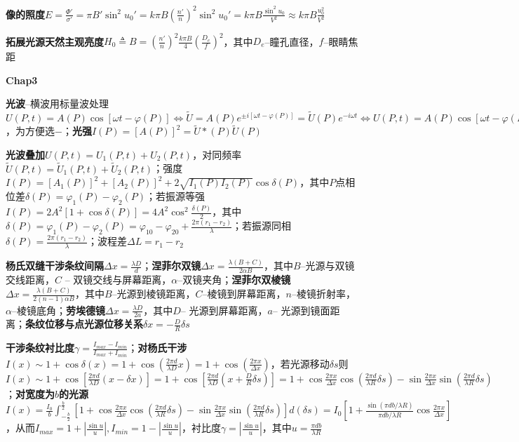 \documentclass[10pt,a4paper]{article}
\begin{document}
\textbf{像的照度}$E=\frac{\Phi'}{\sigma'}=\pi B'\sin^2u_0'=k\pi B(\frac{n'}{n})^2\sin^2u_0'=k\pi B\frac{\sin^2u_0}{V^2}\approx k\pi B\frac{u_0^2}{V^2}$

\textbf{拓展光源天然主观亮度}$H_0\triangleq B=(\frac{n'}{n})^2\frac{k\pi B}{4}(\frac{D_e}{f})^2$，其中$D_e$--瞳孔直径，$f$--眼睛焦距

\textbf{Chap3}

\textbf{光波}--横波用标量波处理$U(P,t)=A(P)\cos[\omega t-\varphi(P)]\Leftrightarrow\widetilde{U}=A(P)e^{\pm i[\omega t-\varphi(P)]}=\widetilde{U}(P)e^{-i\omega t}\Leftrightarrow U(P,t)=A(P)\cos[\omega t-\varphi(P)]$，为方便选$-$；\textbf{光强}$I(P)=[A(P)]^2=\widetilde{U}*(P)\widetilde{U}(P)$

\textbf{光波叠加}$U(P,t)=U_1(P,t)+U_2(P,t)$，对同频率$\widetilde{U}(P,t)=\widetilde{U}_1(P,t)+\widetilde{U}_2(P,t)$；强度$I(P)=[A_1(P)]^2+[A_2(P)]^2+2\sqrt{I_1(P)I_2(P)}\cos\delta(P)$，其中$P$点相位差$\delta(P)=\varphi_1(P)-\varphi_2(P)$；若振源等强$I(P)=2A^2[1+\cos\delta(P)]=4A^2\cos^2\frac{\delta(P)}{2}$，其中$\delta(P)=\varphi_1(P)-\varphi_2(P)=\varphi_{10}-\varphi_{20}+\frac{2\pi(r_1-r_2)}{\lambda}$；若振源同相$\delta(P)=\frac{2\pi(r_1-r_2)}{\lambda}$；波程差$\Delta L=r_1-r_2$

\textbf{杨氏双缝干涉条纹间隔}$\Delta x=\frac{\lambda D}{d}$；\textbf{涅菲尔双镜}$\Delta x=\frac{\lambda(B+C)}{2\alpha B}$，其中$B$--光源与双镜交线距离，$C$ -- 双镜交线与屏幕距离，$\alpha$--双镜夹角；\textbf{涅菲尔双棱镜}$\Delta x=\frac{\lambda(B+C)}{2(n-1)\alpha B}$，其中$B$--光源到棱镜距离，$C$--棱镜到屏幕距离，$n$--棱镜折射率，$\alpha$--棱镜底角；\textbf{劳埃德镜}$\Delta x=\frac{\lambda D}{2a}$，其中$D$-- 光源到屏幕距离，$a$-- 光源到镜面距离；\textbf{条纹位移与点光源位移关系}$\delta x=-\frac{D}{R}\delta s$

\textbf{干涉条纹衬比度}$\gamma=\frac{I_{max}-I_{min}}{I_{max}+I_{min}}$；\textbf{对杨氏干涉}$I(x)\sim1+\cos\delta(x)=1+\cos(\frac{2\pi d}{\lambda D}x)=1+\cos(\frac{2\pi x}{\Delta x})$，若光源移动$\delta s$则$I(x)\sim1+\cos[\frac{2\pi d}{\lambda D}(x-\delta x)]=1+\cos[\frac{2\pi d}{\lambda D}(x+\frac{D}{R}\delta s)]=1+\cos\frac{2\pi x}{\Delta x}\cos(\frac{2\pi d}{\lambda R}\delta s)-\sin\frac{2\pi x}{\Delta x}\sin(\frac{2\pi d}{\lambda R}\delta s)$；\textbf{对宽度为$b$的光源}$I(x)=\frac{I_0}{b}\int_{-\frac{b}{2}}^{\frac{b}{2}}[1+\cos\frac{2\pi x}{\Delta x}\cos(\frac{2\pi d}{\lambda R}\delta s)-\sin\frac{2\pi x}{\Delta x}\sin(\frac{2\pi d}{\lambda R}\delta s)]d(\delta s)=I_0[1+\frac{\sin(\pi db/\lambda R)}{\pi db/\lambda R}\cos\frac{2\pi x}{\Delta x}]$，从而$I_{max}=1+|\frac{\sin u}{u}|,I_{min}=1-|\frac{\sin u}{u}|$，衬比度$\gamma=|\frac{\sin u}{u}|$，其中$u=\frac{\pi db}{\lambda R}$
\end{document}
